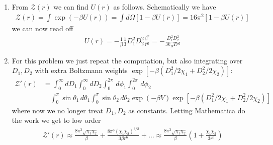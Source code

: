 \documentclass{article}
\theoremstyle{definition}
\newcommand{\be}{\beta}
\newcommand{\f}[2]{\frac{#1}{#2}}
\newcommand{\lp}{\left(}
\newcommand{\rp}{\right)}
\begin{document}
\begin{enumerate}[label=(\alph*)]
\begin{lstlisting}
	(*First order*)
	In[33]:= (*First order*)
	
	In[34]:= Integrate[Sin[\[Theta]1]*Sin[\[Theta]2]*\[Beta] (D1*D2)/(R^3)*(2*Cos[\[Theta]1]*
	Cos[\[Theta]2] - 
	Sin[\[Theta]1]*Sin[\[Theta]2]*
	Cos[\[Phi]1 - \[Phi]2] ), {\[Theta]1, 0, Pi}, {\[Theta]2, 0, 
	Pi}, {\[Phi]1, 0, 2 Pi}, {\[Phi]2, 0, 2 Pi}]
	
	Out[34]= 0
	
	(*Second order*)
	In[32]:= (*Second order*)
	
	In[25]:= Integrate[Sin[\[Theta]1]*Sin[\[Theta]2]*(\[Beta]^2/
	2)*(D1*D2)^2/(R^6)*(2*Cos[\[Theta]1]*Cos[\[Theta]2] - 
	Sin[\[Theta]1]*Sin[\[Theta]2]*
	Cos[\[Phi]1 - \[Phi]2] )^2, {\[Theta]1, 0, Pi}, {\[Theta]2, 0, 
	Pi}, {\[Phi]1, 0, 2 Pi}, {\[Phi]2, 0, 2 Pi}]
	
	Out[25]= (16 D1^2 D2^2 \[Pi]^2 \[Beta]^2)/(3 R^6)
	\end{lstlisting}
	
	\item From $\mathcal{Z}(r)$ we can find $U(r)$ as follows. Schematically we have
	\begin{align*}
	\mathcal{Z}(r) = \int \exp(-\be U(r)) = \int d\Omega [1-\be U(r)] = 16\pi^2 [1-\be U(r)]
	\end{align*}
	we can now read off 
	\begin{align*}
	U(r) = -\f{1}{\be} \f{1}{3} D_1^2 D_2^2 \f{\be^2}{r^6} = \boxed{ -\f{D_1^2 D_2^2 }{3k_BT r^6 }} 
	\end{align*}
	
	\item For this problem we just repeat the computation, but also integrating over $D_1, D_2$ with extra Boltzmann weights $\exp[-\be(D_1^2/2\chi_1 + D_2^2/2\chi_2)]$: 
	\begin{align*}
	\mathcal{Z}'(r) &= \int_0^\infty d D_1\int_0^\infty dD_2\int_0^{2\pi}\,d\phi_1 \int_0^{2\pi}\,d\phi_2 \\
	&\quad\int_0^\pi \sin\theta_1 \, d\theta_1 \int_0^\pi \sin\theta_2\, d\theta_2 \exp(-\be V) \exp[-\be(D_1^2/2\chi_1 + D_2^2/2\chi_2)]
	\end{align*}
	where now we no longer treat $D_1,D_2$ as constants. Letting Mathematica do the work we get to low order
	\begin{align*}
	\mathcal{Z}'(r) \approx \f{8\pi^3 \sqrt{\chi_1\chi_2}}{\be } + \f{8\pi^3 (\chi_1\chi_2)^{3/2}}{3\be r^6} + \dots \approx \boxed{ \f{8\pi^3 \sqrt{\chi_1\chi_2}}{\be }\lp 1 + \f{\chi_1\chi_2}{3r^6} \rp}
	\end{align*}
	

\end{enumerate}
\end{document}
